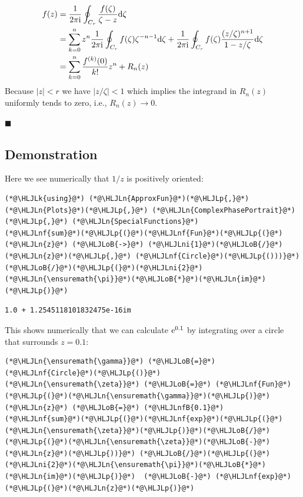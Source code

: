 \documentclass[12pt,a4paper]{article}
\newcommand{\HLJLk}[1]{\textcolor[RGB]{148,91,176}{\textbf{#1}}}
\newcommand{\HLJLn}[1]{#1}
\newcommand{\HLJLnf}[1]{\textcolor[RGB]{66,102,213}{#1}}
\newcommand{\HLJLnfB}[1]{\textcolor[RGB]{59,151,46}{#1}}
\newcommand{\HLJLni}[1]{\textcolor[RGB]{59,151,46}{#1}}
\newcommand{\HLJLoB}[1]{\textcolor[RGB]{102,102,102}{\textbf{#1}}}
\newcommand{\HLJLp}[1]{#1}
\def\D{ {\rm d} }
\def\I{ {\rm i} }
\def\E{ {\rm e} }
\def\mdblksquare{\blacksquare}
\begin{document}
\begin{align*}
f(z) &= {1 \over 2 \pi \I} \oint_{C_r} {f(\zeta) \over \zeta - z} \D \zeta \\
&= 
\sum_{k=0}^n z^n {1 \over 2 \pi \I}  \oint_{C_r} f(\zeta) \zeta^{-n-1} \D \zeta + {1 \over 2 \pi \I} \oint_{C_r} f(\zeta)  {(z/\zeta)^{n+1} \over 1 - z/\zeta} \D \zeta \\
&=
\sum_{k=0}^n {f^{(k)}(0) \over k!} z^n + R_n(z)
\end{align*}
Because $|z| < r$ we have $|z/\zeta| < 1$ which implies the integrand in $R_n(z)$ uniformly tends to zero, i.e., $R_n(z) \rightarrow 0$. 

\ensuremath{\mdblksquare}

\subsection{Demonstration}
Here we see numerically that $1/z$ is positively oriented:


\begin{lstlisting}
(*@\HLJLk{using}@*) (*@\HLJLn{ApproxFun}@*)(*@\HLJLp{,}@*) (*@\HLJLn{Plots}@*)(*@\HLJLp{,}@*) (*@\HLJLn{ComplexPhasePortrait}@*)(*@\HLJLp{,}@*) (*@\HLJLn{SpecialFunctions}@*)
(*@\HLJLnf{sum}@*)(*@\HLJLp{(}@*)(*@\HLJLnf{Fun}@*)(*@\HLJLp{(}@*)(*@\HLJLn{z}@*) (*@\HLJLoB{->}@*) (*@\HLJLni{1}@*)(*@\HLJLoB{/}@*)(*@\HLJLn{z}@*)(*@\HLJLp{,}@*) (*@\HLJLnf{Circle}@*)(*@\HLJLp{()))}@*)(*@\HLJLoB{/}@*)(*@\HLJLp{(}@*)(*@\HLJLni{2}@*)(*@\HLJLn{\ensuremath{\pi}}@*)(*@\HLJLoB{*}@*)(*@\HLJLn{im}@*)(*@\HLJLp{)}@*)
\end{lstlisting}

\begin{lstlisting}
1.0 + 1.2545118101832475e-16im
\end{lstlisting}


This shows numerically that we can calculate $\E^{0.1}$ by integrating over a circle that surrounds $z = 0.1$:


\begin{lstlisting}
(*@\HLJLn{\ensuremath{\gamma}}@*) (*@\HLJLoB{=}@*) (*@\HLJLnf{Circle}@*)(*@\HLJLp{()}@*)
(*@\HLJLn{\ensuremath{\zeta}}@*) (*@\HLJLoB{=}@*) (*@\HLJLnf{Fun}@*)(*@\HLJLp{(}@*)(*@\HLJLn{\ensuremath{\gamma}}@*)(*@\HLJLp{)}@*)
(*@\HLJLn{z}@*) (*@\HLJLoB{=}@*) (*@\HLJLnfB{0.1}@*)
(*@\HLJLnf{sum}@*)(*@\HLJLp{(}@*)(*@\HLJLnf{exp}@*)(*@\HLJLp{(}@*)(*@\HLJLn{\ensuremath{\zeta}}@*)(*@\HLJLp{)}@*)(*@\HLJLoB{/}@*)(*@\HLJLp{(}@*)(*@\HLJLn{\ensuremath{\zeta}}@*)(*@\HLJLoB{-}@*)(*@\HLJLn{z}@*)(*@\HLJLp{))}@*) (*@\HLJLoB{/}@*)(*@\HLJLp{(}@*)(*@\HLJLni{2}@*)(*@\HLJLn{\ensuremath{\pi}}@*)(*@\HLJLoB{*}@*)(*@\HLJLn{im}@*)(*@\HLJLp{)}@*)  (*@\HLJLoB{-}@*) (*@\HLJLnf{exp}@*)(*@\HLJLp{(}@*)(*@\HLJLn{z}@*)(*@\HLJLp{)}@*)
\end{lstlisting}
\end{document}
